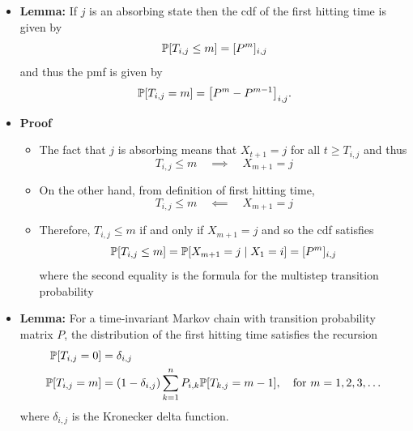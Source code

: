 \documentclass[11pt,twoside]{report}
\begin{document}
\begin{itemize}
%
%




\item \textbf{Lemma:}
 If $j$ is an absorbing state then the cdf of the first hitting time is given by
\[
\pr{ T_{i,j} \le m}   = [ P^m]_{i,j} 
\]
and thus the pmf is given by
\[
\pr{ T_{i,j}=m} =\left[P^{m}-P^{m-1}\right]_{i,j}.
\]

\item \textbf{Proof} 
\begin{itemize}
\item  The fact that $j$ is absorbing means that $X_{t+1} = j$ for all $t \ge T_{i,j}$ and thus
\[
T_{i,j} \le m \quad \implies  \quad X_{m+1}  = j 
\]
\item On the other hand, from definition of first hitting time, 
\[
T_{i,j} \le m \quad \impliedby \quad X_{m+1}  = j 
\]
\item Therefore, $T_{i,j} \le m$ if and only if $X_{m+1}  = j $ and so the cdf satisfies
\[
\pr{ T_{i,j} \le m}  =\pr{ X_{m+1}  = j \mid X_1 = i}  = [ P^m]_{i,j} 
\]
where the second  equality is the formula for the multistep transition probability
\end{itemize}


\item \textbf{Lemma:} For a time-invariant Markov chain with transition probability matrix $P$, the distribution of the first hitting time satisfies the recursion 
\begin{align*}
\pr{T_{i,j} = 0}  & = \delta_{i,j}\\
\pr{T_{i,j} = m} & =(1-\delta_{i,j})\sum_{k=1}^{n}P_{i,k}\pr{T_{k,j} = m-1} , \quad \text{for $m =  1,2,3,\dots$} 
\end{align*}
where $\delta_{i,j}$ is the Kronecker delta function. 




\end{itemize}
\end{document}
